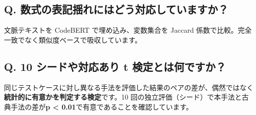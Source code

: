 \documentclass[a5paper,11pt]{ltjsarticle}
\begin{document}
\subsection*{Q. 数式の表記揺れにはどう対応していますか？}
\small
文脈テキストを CodeBERT で埋め込み、変数集合を Jaccard 係数で比較。完全一致でなく類似度ベースで吸収しています。
\normalsize

\subsection*{Q. 10 シードや対応あり t 検定とは何ですか？}
\small
同じテストケースに対し異なる手法を評価した結果のペアの差が、偶然ではなく\textbf{統計的に有意かを判定する検定}です。10 回の独立評価（シード）で本手法と古典手法の差が\textbf{p < 0.01}で有意であることを確認しています。
\normalsize
\end{document}
